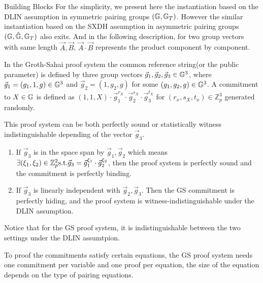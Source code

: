 \begin{subsection}{Building Blocks}
    For the simplicity, we present here the instantiation based on the DLIN assumption in symmetric pairing groups $(\mathbb{G}, \mathbb{G}_T)$. However the similar instantiation based on the SXDH assumption in asymmetric pairing groups $(\mathbb{G}, \hat{\mathbb{G}}, \mathbb{G}_T)$ also exits. And in the following description, for two group vectors with same length $\vec{A}, \vec{B}$, $\vec{A} \cdot \vec{B}$ represents the product component by component.
    
    In the Groth-Sahai proof system the common reference string(or the public parameter) is defined by three group vectors $\vec{g}_1, \vec{g}_2, \vec{g}_3 \in \mathbb{G}^3$, where $\vec{g}_1 = (g_1, 1, g) \in \mathbb{G}^3$ and $\vec{g}_2 = (1, g_2, g)$ for some $(g_1, g_2, g) \in \mathbb{G}^3$. A commitment to $X \in \mathbb{G}$ is defined as $(1, 1, X) \cdot \vec{g}_1^{r_X} \cdot \vec{g}_2^{s_X} \cdot \vec{g}_3^{t_X}$ for $(r_x, s_X, t_x) \in \mathbb{Z}_p^3$ generated randomly.

    This proof system can be both perfectly sound or statistically witness indistinguishable depending of the vector $\vec{g}_3$.
    \begin{enumerate}
    \item If $\vec{g}_3$ is in the space span by $\vec{g}_1, \vec{g}_2$ which means $\exists (\xi_1, \xi_2) \in \mathbb{Z}_p^2 \textrm{s.t.} \vec{g}_3 = \vec{g}_1^{\xi_1} \cdot \vec{g}_2^{\xi_2}$, then the proof system is perfectly sound and the commitment is perfectly binding.
    \item If $\vec{g}_3$ is linearly independent with $\vec{g}_2, \vec{g}_3$. Then the GS commitment is perfectly hiding, and the proof system is witness-indistinguishable under the DLIN assumption.
    \end{enumerate}

    Notice that for the GS proof system, it is indistinguishable between the two settings under the DLIN assumtpion. 

    To proof the commitments satisfy certain equations, the GS proof system needs one commitment per variable and one proof per equation, the size of the equation depends on the type of pairing equations.

\end{subsection}












